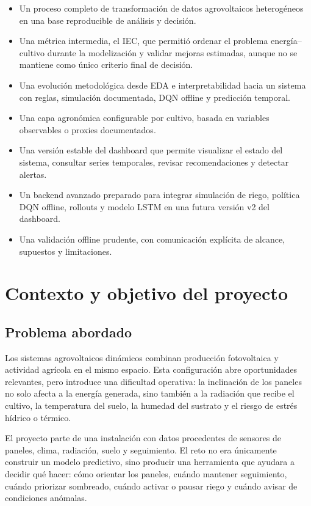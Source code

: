 ﻿\documentclass[11pt,a4paper]{article}
\begin{document}
\begin{itemize}
    \item Un proceso completo de transformación de datos agrovoltaicos heterogéneos en una base reproducible de análisis y decisión.
    \item Una métrica intermedia, el IEC, que permitió ordenar el problema energía--cultivo durante la modelización y validar mejoras estimadas, aunque no se mantiene como único criterio final de decisión.
    \item Una evolución metodológica desde EDA e interpretabilidad hacia un sistema con reglas, simulación documentada, DQN offline y predicción temporal.
    \item Una capa agronómica configurable por cultivo, basada en variables observables o proxies documentados.
    \item Una versión estable del dashboard que permite visualizar el estado del sistema, consultar series temporales, revisar recomendaciones y detectar alertas.
    \item Un backend avanzado preparado para integrar simulación de riego, política DQN offline, rollouts y modelo LSTM en una futura versión v2 del dashboard.
    \item Una validación offline prudente, con comunicación explícita de alcance, supuestos y limitaciones.
\end{itemize}

\newpage

\section{Contexto y objetivo del proyecto}

\subsection{Problema abordado}

Los sistemas agrovoltaicos dinámicos combinan producción fotovoltaica y actividad agrícola en el mismo espacio. Esta configuración abre oportunidades relevantes, pero introduce una dificultad operativa: la inclinación de los paneles no solo afecta a la energía generada, sino también a la radiación que recibe el cultivo, la temperatura del suelo, la humedad del sustrato y el riesgo de estrés hídrico o térmico.

El proyecto parte de una instalación con datos procedentes de sensores de paneles, clima, radiación, suelo y seguimiento. El reto no era únicamente construir un modelo predictivo, sino producir una herramienta que ayudara a decidir qué hacer: cómo orientar los paneles, cuándo mantener seguimiento, cuándo priorizar sombreado, cuándo activar o pausar riego y cuándo avisar de condiciones anómalas.
\end{document}
